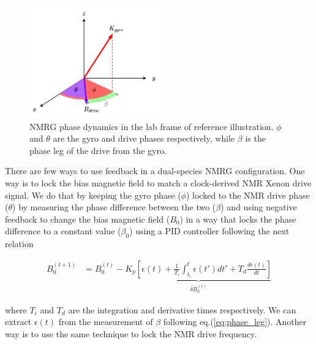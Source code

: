 \documentclass{article}
\begin{document}
\begin{figure}[h]
\centering
\includegraphics[width=0.5\textwidth]{Theory/Figures/NMRG_phase_dynamics.png}
\caption{NMRG phase dynamics in the lab frame of reference illustration. $\phi$ and $\theta$ are the gyro and drive phases respectively, while $\beta$ is the phase leg of the drive from the gyro.}
\label{fig:nmrg_phase_dynamics}
\end{figure}

There are few ways to use feedback in a dual-species NMRG configuration. One way is to lock the bias magnetic field to match a clock-derived NMR Xenon drive signal. We do that by keeping the gyro phase ($\phi$) locked to the NMR drive phase ($\theta$) by measuring the phase difference between the two ($\beta$) and using negative feedback to change the bias magnetic field ($B_0$) in a way that locks the phase difference to a constant value ($\beta_0$) using a PID controller following the next relation

\begin{align}
     B_{0}^{\left(t+1\right)} &= B_{0}^{\left(t\right)} - \underset{\delta B_{0}^{\left(t\right)}}{\underbrace{K_p \left[ \epsilon\left(t\right) + \frac{1}{T_i} \int_{t_i}^{t} \epsilon\left(t'\right)dt' + T_{d} \frac{d \epsilon\left(t\right)}{dt} \right]}}
\end{align}

where $T_i$ and $T_d$ are the integration and derivative times respectively. We can extract $\epsilon\left(t\right)$ from the measurement of $\beta$ following eq.(\ref{eq:phase_leg}). Another way is to use the same technique to lock the NMR drive frequency. 



\end{document}
